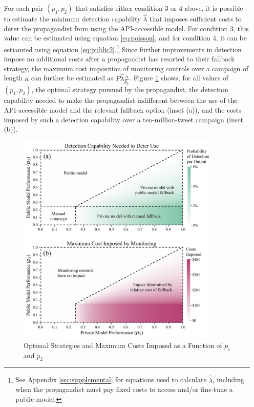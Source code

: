 \documentclass{article}
\begin{document}
For each pair $(p_1, p_2)$ that satisfies either condition 3 or 4 above, it is possible to estimate the minimum detection capability $\hat{\lambda}$ that imposes sufficient costs to deter the propagandist from using the API-accessible model. For condition 3, this value can be estimated using equation \ref{eq:poisson}, and for condition 4, it can be estiamted using equation \ref{eq:public2}.\footnote{See Appendix \ref{sec:supplemental} for equations used to calculate $\hat{\lambda}$, including when the propagandist must pay fixed costs to access and/or fine-tune a public model.} Since further improvements in detection impose no additional costs after a propagandist has resorted to their fallback strategy, the maximum cost imposition of monitoring controls over a campaign of length $n$ can further be estimated as $P \hat{\lambda} \frac{n}{p_1}$. Figure \ref{fig:strategies} shows, for all values of $(p_1, p_2)$, the optimal strategy pursued by the propagandist, the detection capability needed to make the propagandist indifferent between the use of the API-accessible model and the relevant fallback option (inset (a)), and the costs imposed by such a detection capability over a ten-million-tweet campaign (inset (b)). 

\begin{figure}[h]
  \centering
  \includegraphics[width=0.9\textwidth]{figures/strategies_edited.jpg}
  \caption{Optimal Strategies and Maximum Costs Imposed as a Function of $p_1$ and $p_2$}
  \label{fig:strategies}
\end{figure}
\end{document}
